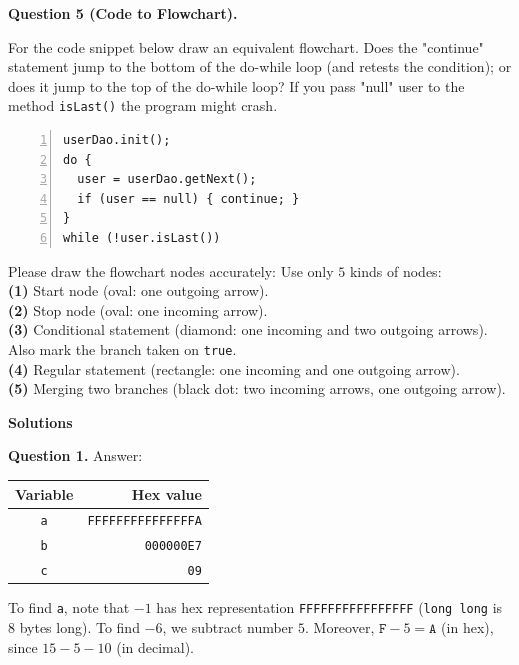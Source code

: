 \documentclass[11pt]{article}
\begin{document}
\vspace{20pt}
{\bf Question 5 (Code to Flowchart).}

For the code snippet below draw an equivalent flowchart. 
Does the "continue" statement jump to the bottom 
of the do-while loop (and retests the condition); 
or does it jump to the top of the do-while loop?
If you pass "null" user to the method {\tt isLast()} 
the program might crash.

{\footnotesize
\begin{center}
\begin{minipage}{.85\columnwidth}
\begin{Verbatim}[frame=single,numbers=left]
userDao.init();
do {    
  user = userDao.getNext();
  if (user == null) { continue; }
}
while (!user.isLast())
\end{Verbatim}
\end{minipage}
\end{center}
}

{\footnotesize
Please draw the flowchart nodes accurately: Use only $5$ kinds of nodes:\\
{\bf (1)} Start node (oval: one outgoing arrow).\\
{\bf (2)} Stop node (oval: one incoming arrow).\\
{\bf (3)} Conditional statement (diamond: one incoming and two outgoing arrows). Also mark the branch taken on {\tt true}. \\
{\bf (4)} Regular statement (rectangle: one incoming and one outgoing arrow).\\
{\bf (5)} Merging two branches (black dot: two incoming arrows, one outgoing arrow).
}

\newpage

{\bf \Large Solutions}

\vspace{10pt}
{\bf Question 1.} Answer:

\begin{tabular}{|c|r|} \hline
{\bf Variable} & {\bf Hex value} \\ \hline
{\tt a} & {\tt FFFFFFFFFFFFFFFA} \\ \hline
{\tt b} & {\tt 000000E7} \\ \hline
{\tt c} & {\tt 09} \\ \hline
\end{tabular}

To find {\tt a}, note that $-1$ has hex representation 
{\tt FFFFFFFFFFFFFFFF} ({\tt long long} is $8$ bytes long). 
To find $-6$, we subtract number $5$. Moreover, $\mathtt{F} - 5 = \mathtt{A}$ (in hex), 
since $15 - 5 - 10$ (in decimal).
\end{document}
